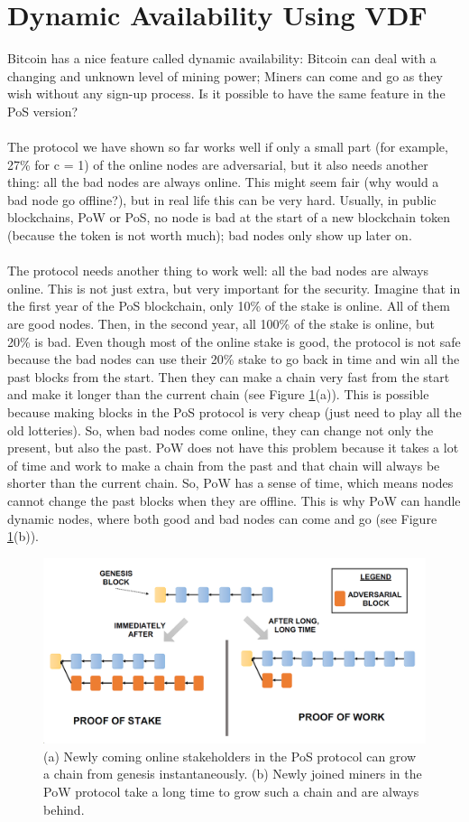 \section{Dynamic Availability Using VDF}
Bitcoin has a nice feature called dynamic availability: Bitcoin can deal with a changing and unknown level of mining power; Miners can come and go as they wish without any sign-up process. Is it possible to have the same feature in the PoS version?\\\\
The protocol we have shown so far works well if only a small part (for example, 27\% for c = 1) of the online nodes are adversarial, but it also needs another thing: all the bad nodes are always online. This might seem fair (why would a bad node go offline?), but in real life this can be very hard. Usually, in public blockchains, PoW or PoS, no node is bad at the start of a new blockchain token (because the token is not worth much); bad nodes only show up later on.\\\\
The protocol needs another thing to work well: all the bad nodes are always online. This is not just extra, but very important for the security. Imagine that in the first year of the PoS blockchain, only 10\% of the stake is online. All of them are good nodes. Then, in the second year, all 100\% of the stake is online, but 20\% is bad. Even though most of the online stake is good, the protocol is not safe because the bad nodes can use their 20\% stake to go back in time and win all the past blocks from the start. Then they can make a chain very fast from the start and make it longer than the current chain (see Figure \ref{fig:f9}(a)). This is possible because making blocks in the PoS protocol is very cheap (just need to play all the old lotteries). So, when bad nodes come online, they can change not only the present, but also the past. PoW does not have this problem because it takes a lot of time and work to make a chain from the past and that chain will always be shorter than the current chain. So, PoW has a sense of time, which means nodes cannot change the past blocks when they are offline. This is why PoW can handle dynamic nodes, where both good and bad nodes can come and go (see Figure \ref{fig:f9}(b)).
\begin{figure}[h!]
    \centering
    \includegraphics[width=0.7\linewidth]{Fig/11/F9}
    \caption{(a) Newly coming online stakeholders in the PoS protocol can grow a chain from genesis
        instantaneously. (b) Newly joined miners in the PoW protocol take a long time to grow such a chain
        and are always behind.}
    \label{fig:f9}
\end{figure}
